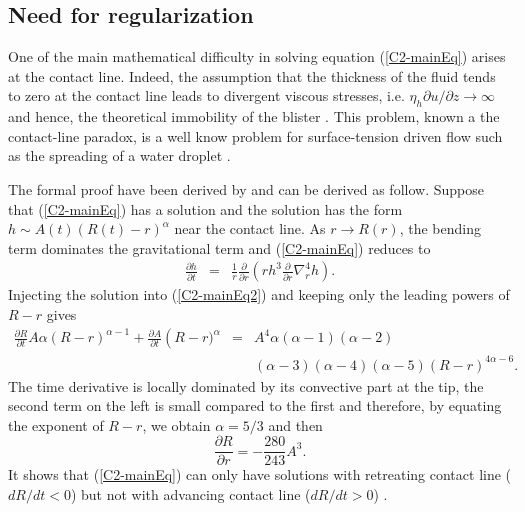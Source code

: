 \subsection{Need for regularization}
\label{C2-sec:need-regularization}

One  of   the  main   mathematical  difficulty  in   solving  equation
(\ref{C2-mainEq}) arises at the  contact line.  Indeed, the assumption
that the  thickness of  the fluid  tends to zero  at the  contact line
leads       to       divergent      viscous       stresses,       i.e.
$\eta_h  \partial  u/\partial  z\rightarrow  \infty$  and  hence,  the
theoretical         immobility          of         the         blister
\citep{Flitton:1999iv,Lister:2013ia,Anonymous:QWXp_4JV}. This problem,
known  a  the  contact-line  paradox,  is  a  well  know  problem  for
surface-tension driven flow  such as the spreading of  a water droplet
\citep{Bertozzi:1998wz,Snoeijer:2013cm}.

The formal proof  have been derived by  \citet{Flitton:1999iv} and can
be derived  as follow. Suppose  that (\ref{C2-mainEq}) has  a solution
and the solution has the  form $h \sim A(t)(R(t)-r)^{\alpha}$ near the
contact line.  As $r \rightarrow R(r)$, the bending term dominates the
gravitational term and (\ref{C2-mainEq}) reduces to
\begin{eqnarray}
  \frac{\partial       h}{\partial       t}&      =&\frac{1}{       r}
                                                     \frac{\partial}{\partial r}\left( rh^3 \frac{\partial}{\partial r}\nabla_r^4h\right).
                                                     \label{C2-mainEq2}
\end{eqnarray}
Injecting the  solution into  (\ref{C2-mainEq2}) and keeping  only the
leading powers of $R-r$ gives
\begin{eqnarray}
  \frac{\partial    R}{\partial    t}    A\alpha\left(R-r\right)^{\alpha-1}+
  \frac{\partial           A}{\partial           t}\left(R-r)^{\alpha}
  &=&A^4\alpha(\alpha-1)(\alpha-2)\nonumber\\
  &&(\alpha-3)(\alpha-4)(\alpha-5)(R-r)^{4\alpha-6}.\nonumber
\end{eqnarray}
The time derivative is locally dominated by its convective part at the
tip, the second  term on the left  is small compared to  the first and
therefore, by equating the exponent of $R-r$, we obtain $\alpha = 5/3$
and then
\begin{equation}
  \frac{\partial R}{\partial r} =-\frac{280}{243} A^3.
\end{equation}
It  shows   that  (\ref{C2-mainEq})  can  only   have  solutions  with
retreating  contact line  ($dR/dt<0$) but  not with  advancing contact
line ($dR/dt>0$) \citep{Lister:2013ia,Flitton:1999iv}.

